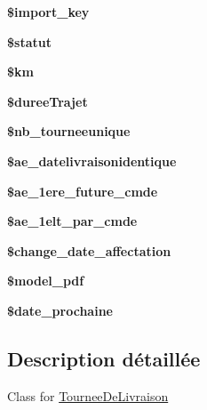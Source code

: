 \begin{DoxyCompactItemize}
\mbox{\label{classTourneeDeLivraison_a7b50634a83a4dc587cb76fe355f917a4}} 
{\bfseries \$import\+\_\+key}
\item 
\mbox{\label{classTourneeDeLivraison_a5a696fa22c62568568e914e76d22d6d1}} 
{\bfseries \$statut}
\item 
\mbox{\label{classTourneeDeLivraison_a82a63121a82eed6e55e306fb050f3d18}} 
{\bfseries \$km}
\item 
\mbox{\label{classTourneeDeLivraison_ac23f9499fc80d3b2f81eed53febb6000}} 
{\bfseries \$duree\+Trajet}
\item 
\mbox{\label{classTourneeDeLivraison_a46bc2f40fad223455e8d53e644d41f33}} 
{\bfseries \$nb\+\_\+tourneeunique}
\item 
\mbox{\label{classTourneeDeLivraison_a1c7ce16a1c81d7cde63492f75cd96a82}} 
{\bfseries \$ae\+\_\+datelivraisonidentique}
\item 
\mbox{\label{classTourneeDeLivraison_a130bbd7150982199f1bdd4206c2c2908}} 
{\bfseries \$ae\+\_\+1ere\+\_\+future\+\_\+cmde}
\item 
\mbox{\label{classTourneeDeLivraison_ad49e33a16298b4118b0b4f19a4d44952}} 
{\bfseries \$ae\+\_\+1elt\+\_\+par\+\_\+cmde}
\item 
\mbox{\label{classTourneeDeLivraison_a66ac189191e1a7208207fa3a93f99a68}} 
{\bfseries \$change\+\_\+date\+\_\+affectation}
\item 
\mbox{\label{classTourneeDeLivraison_a1d0e9320aaa81a52423457b93f66ea6f}} 
{\bfseries \$model\+\_\+pdf}
\item 
\mbox{\label{classTourneeDeLivraison_a9b2ab7686b5a8e022024359597e3d399}} 
{\bfseries \$date\+\_\+prochaine}
\end{DoxyCompactItemize}


\subsection{Description détaillée}
Class for \hyperlink{classTourneeDeLivraison}{Tournee\+De\+Livraison} 


